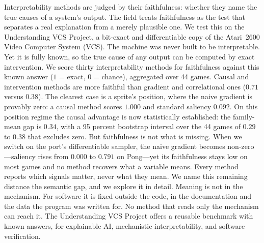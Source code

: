 Interpretability methods are judged by their faithfulness: whether they name the
true causes of a system's output. The field treats faithfulness as the test that
separates a real explanation from a merely plausible one. We test this on the
Understanding VCS Project, a bit-exact and differentiable copy of the Atari~2600 Video
Computer System (VCS).
The machine was never built to be interpretable. Yet it is fully known, so the
true cause of any output can be computed by exact intervention. We score thirty
interpretability methods for faithfulness against this known answer ($1$ = exact,
$0$ = chance), aggregated over 44 games.
Causal and intervention methods are more faithful than gradient and correlational
ones ($0.71$ versus $0.38$). The clearest case is a sprite's
position, where the naive gradient is provably zero: a causal method scores $1.000$
and standard saliency $0.092$. On this position regime the causal advantage is now
statistically established: the family-mean gap is $0.34$, with a 95 percent bootstrap
interval over the 44 games of $0.29$ to $0.38$ that excludes zero. But faithfulness is
not what is missing. When we switch on the port's
differentiable sampler, the naive gradient becomes non-zero---saliency rises
from $0.000$ to $0.791$ on Pong---yet its faithfulness stays low on most games and no
method recovers what a variable means.
Every method reports which signals matter, never what they mean. We name this
remaining distance the semantic gap, and we explore it in detail. Meaning is not in the
mechanism. For software it is fixed outside the code, in the documentation and the
data the program was written for. No method that reads only the mechanism can
reach it. The Understanding VCS Project offers a reusable benchmark with known
answers, for explainable AI, mechanistic interpretability, and software
verification.

